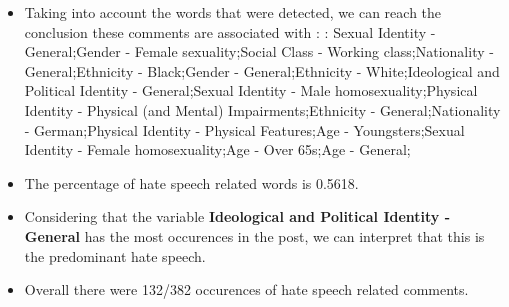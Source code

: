 \documentclass[11pt]{article}
\begin{document}
\begin{itemize}\item Taking into account the words that were detected, we can reach the conclusion these comments are associated with : : Sexual Identity - General;Gender - Female sexuality;Social Class - Working class;Nationality - General;Ethnicity - Black;Gender - General;Ethnicity - White;Ideological and Political Identity - General;Sexual Identity - Male homosexuality;Physical Identity - Physical (and Mental) Impairments;Ethnicity - General;Nationality - German;Physical Identity - Physical Features;Age - Youngsters;Sexual Identity - Female homosexuality;Age - Over 65s;Age - General;%

\item The percentage of hate speech related words is 0.5618.

\item Considering that the variable \textbf{Ideological and Political Identity - General} has the most occurences in the post, we can interpret that this is the predominant hate speech.

\item Overall there were 132/382 occurences of hate speech related comments.\end{itemize}
\end{document}
